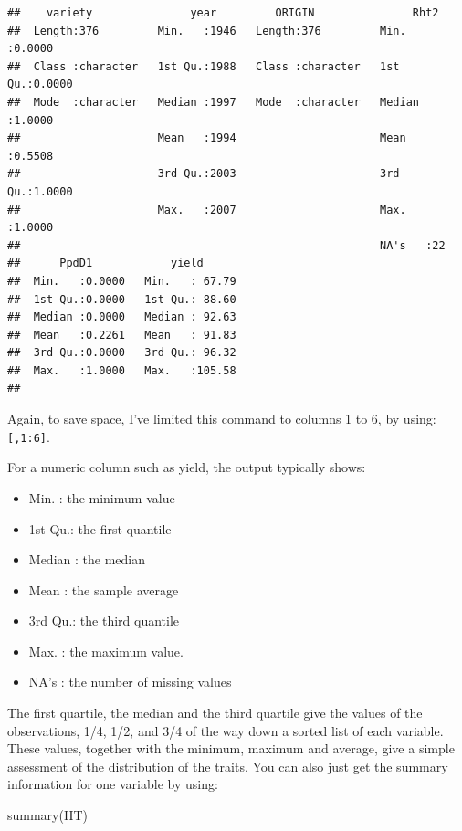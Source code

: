 \documentclass[
]{book}
\newenvironment{Shaded}{\begin{snugshade}}{\end{snugshade}}
\newcommand{\FunctionTok}[1]{\textcolor[rgb]{0.00,0.00,0.00}{#1}}
\newcommand{\NormalTok}[1]{#1}
\providecommand{\tightlist}{%
  \setlength{\itemsep}{0pt}\setlength{\parskip}{0pt}}
\begin{document}
\begin{verbatim}
##    variety               year         ORIGIN               Rht2       
##  Length:376         Min.   :1946   Length:376         Min.   :0.0000  
##  Class :character   1st Qu.:1988   Class :character   1st Qu.:0.0000  
##  Mode  :character   Median :1997   Mode  :character   Median :1.0000  
##                     Mean   :1994                      Mean   :0.5508  
##                     3rd Qu.:2003                      3rd Qu.:1.0000  
##                     Max.   :2007                      Max.   :1.0000  
##                                                       NA's   :22      
##      PpdD1            yield       
##  Min.   :0.0000   Min.   : 67.79  
##  1st Qu.:0.0000   1st Qu.: 88.60  
##  Median :0.0000   Median : 92.63  
##  Mean   :0.2261   Mean   : 91.83  
##  3rd Qu.:0.0000   3rd Qu.: 96.32  
##  Max.   :1.0000   Max.   :105.58  
## 
\end{verbatim}

Again, to save space, I've limited this command to columns 1 to 6, by using: \texttt{{[},1:6{]}}.

For a numeric column such as yield, the output typically shows:

\begin{itemize}
\tightlist
\item
  Min. : the minimum value
\item
  1st Qu.: the first quantile
\item
  Median : the median
\item
  Mean : the sample average
\item
  3rd Qu.: the third quantile
\item
  Max. : the maximum value.
\item
  NA's : the number of missing values
\end{itemize}

The first quartile, the median and the third quartile give the values of the observations, 1/4, 1/2, and 3/4 of the way down a sorted list of each variable. These values, together with the minimum, maximum and average, give a simple assessment of the distribution of the traits.
You can also just get the summary information for one variable by using:

\begin{Shaded}
\begin{Highlighting}[]
\FunctionTok{summary}\NormalTok{(HT)}
\end{Highlighting}
\end{Shaded}
\end{document}
